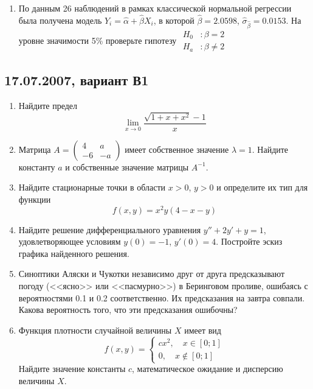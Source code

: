 \documentclass[pdftex,12pt,a4paper]{article}
\begin{document}
\begin{enumerate}
\item По данным 26 наблюдений в рамках классической нормальной регрессии была получена модель $\hat{Y}_i=\hat{\alpha}+\hat{\beta}X_i$, в которой $\hat{\beta}=2.0598$, $\hat{\sigma}_{\hat{\beta}}=0.0153$. На уровне значимости 5\% проверьте гипотезу
$\begin{aligned}
H_0&: \beta=2\\
H_a&: \beta\ne 2
\end{aligned}$
\end{enumerate}

\subsection{17.07.2007, вариант В1}
\begin{enumerate}
\item  Найдите предел
\begin{equation}
\lim_{x\to 0} \frac{\sqrt{1+x+x^2}-1}{x}
\end{equation}
\item Матрица $A=\left(\begin{array}{cc}
4 & a \\ 
-6 & -a
\end{array}\right)$ имеет собственное значение $\lambda=1$. Найдите константу $a$ и собственные значение матрицы $A^{-1}$.
\item Найдите стационарные точки в области $x>0$, $y>0$ и определите их тип для функции
\begin{equation}
f(x,y)=x^2y(4-x-y)
\end{equation}
\item Найдите решение дифференциального уравнения $y''+2y'+y=1$, удовлетворяющее условиям $y(0)=-1$, $y'(0)=4$. Постройте эскиз графика найденного решения.
\item Синоптики Аляски и Чукотки независимо друг от друга предсказывают погоду (<<ясно>> или <<пасмурно>>) в Беринговом проливе, ошибаясь с вероятностями 0.1 и 0.2 соответственно. Их предсказания на завтра совпали. Какова вероятность того, что эти предсказания ошибочны?
\item Функция плотности случайной величины $X$ имеет вид
\begin{equation}
f(x,y)=\left\{\begin{array}{c}
cx^2,\quad x\in[0;1] \\ 
0,\quad x\notin [0;1]
\end{array} \right.
\end{equation}
Найдите значение константы $c$, математическое ожидание и дисперсию величины $X$.

\end{enumerate}
\end{document}
